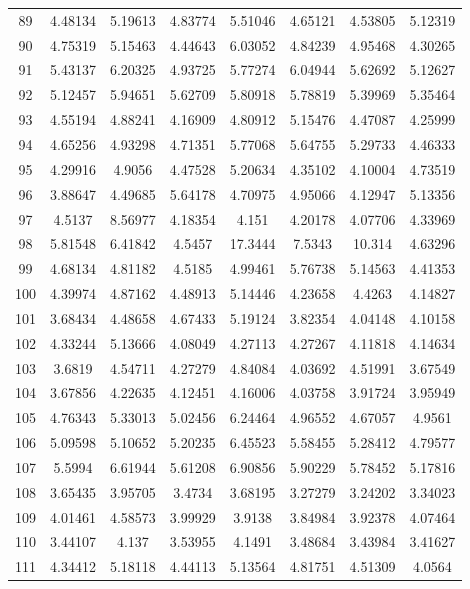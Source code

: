 \begin{figure}
\begin{tabular}{cccccccc}
89 & 4.48134 & 5.19613 & 4.83774 & 5.51046 & 4.65121 & 4.53805 & 5.12319\\
90 & 4.75319 & 5.15463 & 4.44643 & 6.03052 & 4.84239 & 4.95468 & 4.30265\\
91 & 5.43137 & 6.20325 & 4.93725 & 5.77274 & 6.04944 & 5.62692 & 5.12627\\
92 & 5.12457 & 5.94651 & 5.62709 & 5.80918 & 5.78819 & 5.39969 & 5.35464\\
93 & 4.55194 & 4.88241 & 4.16909 & 4.80912 & 5.15476 & 4.47087 & 4.25999\\
94 & 4.65256 & 4.93298 & 4.71351 & 5.77068 & 5.64755 & 5.29733 & 4.46333\\
95 & 4.29916 & 4.9056 & 4.47528 & 5.20634 & 4.35102 & 4.10004 & 4.73519\\
96 & 3.88647 & 4.49685 & 5.64178 & 4.70975 & 4.95066 & 4.12947 & 5.13356\\
97 & 4.5137 & 8.56977 & 4.18354 & 4.151 & 4.20178 & 4.07706 & 4.33969\\
98 & 5.81548 & 6.41842 & 4.5457 & 17.3444 & 7.5343 & 10.314 & 4.63296\\
99 & 4.68134 & 4.81182 & 4.5185 & 4.99461 & 5.76738 & 5.14563 & 4.41353\\
100 & 4.39974 & 4.87162 & 4.48913 & 5.14446 & 4.23658 & 4.4263 & 4.14827\\
101 & 3.68434 & 4.48658 & 4.67433 & 5.19124 & 3.82354 & 4.04148 & 4.10158\\
102 & 4.33244 & 5.13666 & 4.08049 & 4.27113 & 4.27267 & 4.11818 & 4.14634\\
103 & 3.6819 & 4.54711 & 4.27279 & 4.84084 & 4.03692 & 4.51991 & 3.67549\\
104 & 3.67856 & 4.22635 & 4.12451 & 4.16006 & 4.03758 & 3.91724 & 3.95949\\
105 & 4.76343 & 5.33013 & 5.02456 & 6.24464 & 4.96552 & 4.67057 & 4.9561\\
106 & 5.09598 & 5.10652 & 5.20235 & 6.45523 & 5.58455 & 5.28412 & 4.79577\\
107 & 5.5994 & 6.61944 & 5.61208 & 6.90856 & 5.90229 & 5.78452 & 5.17816\\
108 & 3.65435 & 3.95705 & 3.4734 & 3.68195 & 3.27279 & 3.24202 & 3.34023\\
109 & 4.01461 & 4.58573 & 3.99929 & 3.9138 & 3.84984 & 3.92378 & 4.07464\\
110 & 3.44107 & 4.137 & 3.53955 & 4.1491 & 3.48684 & 3.43984 & 3.41627\\
111 & 4.34412 & 5.18118 & 4.44113 & 5.13564 & 4.81751 & 4.51309 & 4.0564\\

\end{tabular}
\end{figure}
